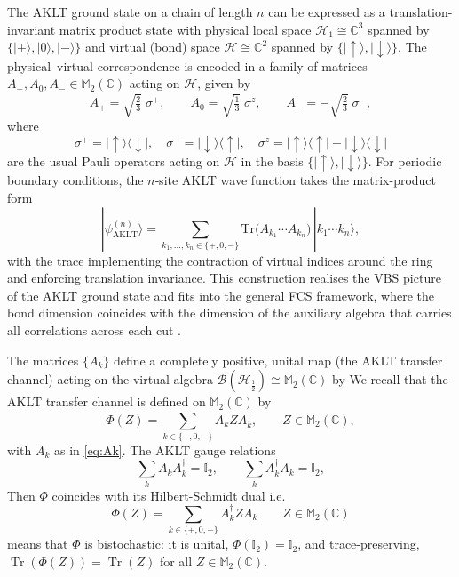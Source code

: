 \documentclass[11pt,a4paper]{article}
\def\Tr{\mathrm{Tr}}
\begin{document}
The AKLT ground state on a chain of length $n$ can be expressed as a translation-invariant matrix product state with physical local space $\mathcal{H}_{1}\cong\mathbb{C}^3$ spanned by $\{|+\rangle,|0\rangle,|-\rangle\}$ and virtual (bond) space $\mathcal{H}\cong\mathbb{C}^2$ spanned by $\{|\uparrow\rangle,|\downarrow\rangle\}$. The physical–virtual correspondence is encoded in a family of matrices $A_{+},A_{0},A_{-}\in\mathbb{M}_2(\mathbb{C})$ acting on $\mathcal{H}$, given by
\begin{equation}\label{eq:Ak}
A_{+} = \sqrt{\tfrac{2}{3}}\;\sigma^{+},
\qquad
A_{0} = \sqrt{\tfrac{1}{3}}\;\sigma^{z},
\qquad
A_{-} = -\sqrt{\tfrac{2}{3}}\;\sigma^{-},
\end{equation}
where
\[
\sigma^{+} = |\uparrow\rangle\langle\downarrow|,
\quad
\sigma^{-} = |\downarrow\rangle\langle\uparrow|,
\quad
\sigma^{z} = |\uparrow\rangle\langle\uparrow|-|\downarrow\rangle\langle\downarrow|
\]
are the usual Pauli operators acting on $\mathcal{H}$ in the basis $\{|\uparrow\rangle,|\downarrow\rangle\}$. For periodic boundary conditions, the $n$‑site AKLT wave function takes the matrix-product form
\begin{equation}\label{eq:AKLT_MPS_finite}
|\psi_{\mathrm{AKLT}}^{(n)}\rangle
=
\sum_{k_1,\dots,k_n\in\{+,0,-\}}
\Tr\!\bigl(A_{k_1}\cdots A_{k_n}\bigr)\,
|k_1\cdots k_n\rangle,
\end{equation}
with the trace implementing the contraction of virtual indices around the ring and enforcing translation invariance. This construction realises the VBS picture of the AKLT ground state and fits into the general FCS framework, where the bond dimension coincides with the dimension of the auxiliary algebra that carries all correlations across each cut \cite{FNW92}.

The matrices $\{A_k\}$ define a completely positive, unital map (the AKLT transfer channel) acting on the virtual algebra $\mathcal{B}(\mathcal{H}_{\frac{1}{2}})\cong\mathbb{M}_2(\mathbb{C})$ by
We recall that the AKLT transfer channel is defined on $\mathbb{M}_2(\mathbb{C})$ by
\begin{equation}\label{eq:aklt_channel}
\Phi(Z)
=
\sum_{k\in\{+,0,-\}} A_k Z A_k^{\dagger},
\qquad
Z\in\mathbb{M}_2(\mathbb{C}),
\end{equation}
with $A_k$ as in \eqref{eq:Ak}. The AKLT gauge relations
\[
\sum_{k} A_k A_k^{\dagger} = \mathbb{I}_2,
\qquad
\sum_{k} A_k^{\dagger} A_k = \mathbb{I}_2,
\]
Then $\Phi$ coincides with its Hilbert-Schmidt dual i.e.
$$
\Phi(Z)
=
\sum_{k\in\{+,0,-\}} A_k^{\dagger} Z A_k \qquad  Z\in\mathbb{M}_2(\mathbb{C})
$$
means that $\Phi$ is bistochastic: it is unital, $\Phi(\mathbb{I}_2)=\mathbb{I}_2$, and trace-preserving, $\operatorname{Tr}(\Phi(Z))=\operatorname{Tr}(Z)$ for all $Z\in\mathbb{M}_2(\mathbb{C})$.
\end{document}

